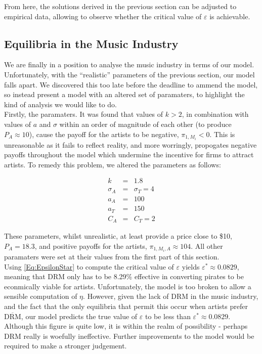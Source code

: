 \documentclass[a4paper,12pt]{article}
\numberwithin{equation}{section}
\newcommand{\drm}{\text{DRM}}
\newcommand{\nodrm}{\overline{\drm}}
\newcommand{\artistpayoff}[2]{\pi_{#1, M_{#2}}}
\newcommand{\artistalbum}[2]{\pi_{#1, M_{#2}, A}}
\begin{document}
From here, the solutions derived in the previous section can be adjusted
to empirical data, allowing to observe whether the critical value
of $\varepsilon$ is achievable.

\subsection{Equilibria in the Music Industry}

We are finally in a position to analyse the music industry in terms of our model. Unfortunately, with the ``realistic'' parameters of the previous section, our model falls apart. We discovered this too late before the deadline to ammend the model, so instead present a model with an altered set of paramaters, to highlight the kind of analysis we would like to do.\\

Firstly, the paramaters. It was found that values of $k > 2$, in combination with values of $a$ and $\sigma$ within an order of magnitude of each other (to produce $P_A \approx 10$), cause the payoff for the artists to be negative, $\artistpayoff{1}{i} < 0$. This is unreasonable as it fails to reflect reality, and more worringly, propogates negative payoffs throughout the model which undermine the incentive for firms to attract artists. To remedy this problem, we altered the parameters as follows:

\begin{eqnarray*}
k & = & 1.8\\
\sigma_A & = & \sigma_T = 4\\
a_A & = & 100\\
a_T & = & 150\\
C_A & = & C_T = 2
\end{eqnarray*}

These parameters, whilst unrealistic, at least provide a price close to \$10, $P_A = 18.3$, and positive payoffs for the artists, $\artistalbum{1}{i} \approx 104$. All other paramaters were set at their values from the first part of this section.\\

Using \eqref{Eq:EpsilonStar} to compute the critical value of $\varepsilon$ yields $\varepsilon^* \approx 0.0829$, meaning that DRM only has to be 8.29\% effective in converting pirates to be econmically viable for artists. Unfortunately, the model is too broken to allow a sensible computation of $\eta$. However, given the lack of DRM in the music industry, and the fact that the only equilibria that permit this occur when artists prefer $\nodrm$, our model predicts the true value of $\varepsilon$ to be less than $\varepsilon^* \approx 0.0829$. Although this figure is quite low, it is within the realm of possibility - perhaps DRM really is woefully ineffective. Further improvements to the model would be required to make a stronger judgement.
\end{document}
